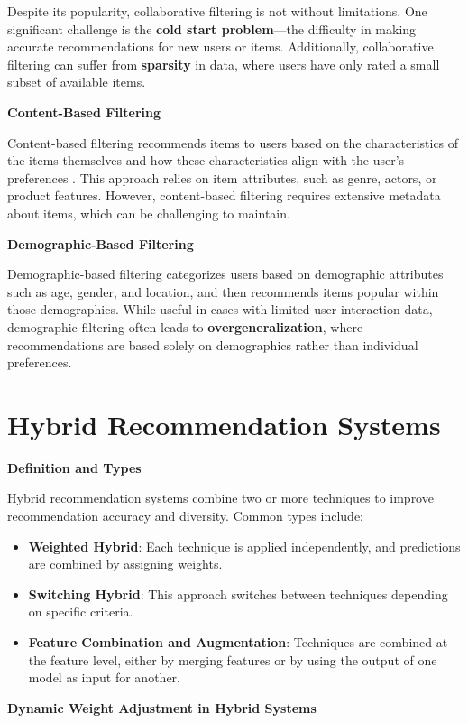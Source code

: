 \documentclass{article}
\begin{document}
Despite its popularity, collaborative filtering is not without limitations. One significant challenge is the \textbf{cold start problem}—the difficulty in making accurate recommendations for new users or items. Additionally, collaborative filtering can suffer from \textbf{sparsity} in data, where users have only rated a small subset of available items.

\textbf{Content-Based Filtering}

Content-based filtering recommends items to users based on the characteristics of the items themselves and how these characteristics align with the user's preferences \cite{Burke2002}. This approach relies on item attributes, such as genre, actors, or product features. However, content-based filtering requires extensive metadata about items, which can be challenging to maintain.

\textbf{Demographic-Based Filtering}

Demographic-based filtering categorizes users based on demographic attributes such as age, gender, and location, and then recommends items popular within those demographics. While useful in cases with limited user interaction data, demographic filtering often leads to \textbf{overgeneralization}, where recommendations are based solely on demographics rather than individual preferences.

\section{Hybrid Recommendation Systems}

\textbf{Definition and Types}

Hybrid recommendation systems combine two or more techniques to improve recommendation accuracy and diversity. Common types include:

\begin{itemize}
    \item \textbf{Weighted Hybrid}: Each technique is applied independently, and predictions are combined by assigning weights.
    \item \textbf{Switching Hybrid}: This approach switches between techniques depending on specific criteria.
    \item \textbf{Feature Combination and Augmentation}: Techniques are combined at the feature level, either by merging features or by using the output of one model as input for another.
\end{itemize}

\textbf{Dynamic Weight Adjustment in Hybrid Systems}
\end{document}
